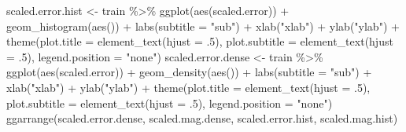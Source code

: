 \documentclass[
]{article}
\newenvironment{Shaded}{\begin{snugshade}}{\end{snugshade}}
\newcommand{\AttributeTok}[1]{\textcolor[rgb]{0.77,0.63,0.00}{#1}}
\newcommand{\DecValTok}[1]{\textcolor[rgb]{0.00,0.00,0.81}{#1}}
\newcommand{\FunctionTok}[1]{\textcolor[rgb]{0.00,0.00,0.00}{#1}}
\newcommand{\NormalTok}[1]{#1}
\newcommand{\OtherTok}[1]{\textcolor[rgb]{0.56,0.35,0.01}{#1}}
\newcommand{\SpecialCharTok}[1]{\textcolor[rgb]{0.00,0.00,0.00}{#1}}
\newcommand{\StringTok}[1]{\textcolor[rgb]{0.31,0.60,0.02}{#1}}
\begin{document}
\begin{Shaded}
\begin{Highlighting}[]
\NormalTok{scaled.error.hist }\OtherTok{\textless{}{-}}\NormalTok{ train }\SpecialCharTok{\%\textgreater{}\%} 
  \FunctionTok{ggplot}\NormalTok{(}\FunctionTok{aes}\NormalTok{(scaled.error)) }\SpecialCharTok{+} 
  \FunctionTok{geom\_histogram}\NormalTok{(}\FunctionTok{aes}\NormalTok{()) }\SpecialCharTok{+}
  \FunctionTok{labs}\NormalTok{(}\AttributeTok{subtitle =} \StringTok{"sub"}\NormalTok{) }\SpecialCharTok{+} 
  \FunctionTok{xlab}\NormalTok{(}\StringTok{"xlab"}\NormalTok{) }\SpecialCharTok{+}
  \FunctionTok{ylab}\NormalTok{(}\StringTok{"ylab"}\NormalTok{) }\SpecialCharTok{+}
  \FunctionTok{theme}\NormalTok{(}\AttributeTok{plot.title =} \FunctionTok{element\_text}\NormalTok{(}\AttributeTok{hjust =}\NormalTok{ .}\DecValTok{5}\NormalTok{), }\AttributeTok{plot.subtitle =} \FunctionTok{element\_text}\NormalTok{(}\AttributeTok{hjust =}\NormalTok{ .}\DecValTok{5}\NormalTok{), }\AttributeTok{legend.position =} \StringTok{"none"}\NormalTok{)}
\NormalTok{scaled.error.dense }\OtherTok{\textless{}{-}}\NormalTok{ train }\SpecialCharTok{\%\textgreater{}\%} 
  \FunctionTok{ggplot}\NormalTok{(}\FunctionTok{aes}\NormalTok{(scaled.error)) }\SpecialCharTok{+} 
  \FunctionTok{geom\_density}\NormalTok{(}\FunctionTok{aes}\NormalTok{()) }\SpecialCharTok{+}
  \FunctionTok{labs}\NormalTok{(}\AttributeTok{subtitle =} \StringTok{"sub"}\NormalTok{) }\SpecialCharTok{+} 
  \FunctionTok{xlab}\NormalTok{(}\StringTok{"xlab"}\NormalTok{) }\SpecialCharTok{+}
  \FunctionTok{ylab}\NormalTok{(}\StringTok{"ylab"}\NormalTok{) }\SpecialCharTok{+}
  \FunctionTok{theme}\NormalTok{(}\AttributeTok{plot.title =} \FunctionTok{element\_text}\NormalTok{(}\AttributeTok{hjust =}\NormalTok{ .}\DecValTok{5}\NormalTok{), }\AttributeTok{plot.subtitle =} \FunctionTok{element\_text}\NormalTok{(}\AttributeTok{hjust =}\NormalTok{ .}\DecValTok{5}\NormalTok{), }\AttributeTok{legend.position =} \StringTok{"none"}\NormalTok{)}
\FunctionTok{ggarrange}\NormalTok{(scaled.error.dense, scaled.mag.dense, scaled.error.hist, scaled.mag.hist)}
\end{Highlighting}
\end{Shaded}

\begin{Shaded}
\end{Shaded}

\begin{Shaded}
\end{Shaded}
\end{document}
